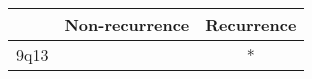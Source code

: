 \begin{tabular}{lcc}
\toprule
{} & Non-recurrence & Recurrence \\
\midrule
9q13 &                &          * \\
\bottomrule
\end{tabular}
